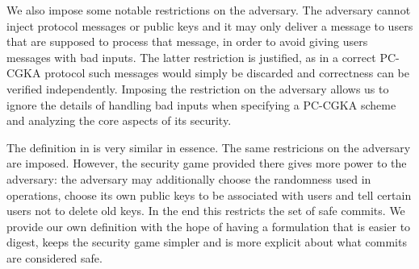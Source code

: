 We also impose some notable restrictions on the adversary. The adversary cannot inject protocol messages or public keys and it may only deliver a message to users that are supposed to process that message, in order to avoid giving users messages with bad inputs. The latter restriction is justified, as in a correct PC-CGKA protocol such messages would simply be discarded and correctness can be verified independently. Imposing the restriction on the adversary allows us to ignore the details of handling bad inputs when specifying a PC-CGKA scheme and analyzing the core aspects of its security.

The definition in \cite[Section B.1]{modular-group-messaging} is very similar in essence. The same restricions on the adversary are imposed. However, the security game provided there gives more power to the adversary: the adversary may additionally choose the randomness used in operations, choose its own public keys to be associated with users and tell certain users not to delete old keys. In the end this restricts the set of safe commits. We provide our own definition with the hope of having a formulation that is easier to digest, keeps the security game simpler and is more explicit about what commits are considered safe.

